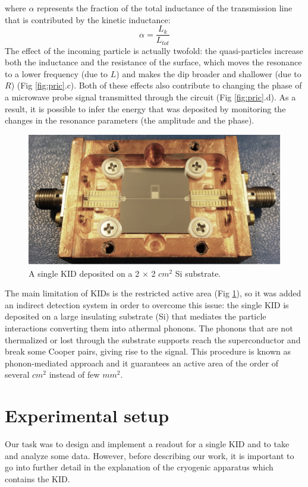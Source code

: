 \documentclass[12pt]{article}
\begin{document}
where $\alpha$ represents the fraction of the total inductance of the transmission line that is contributed by the kinetic inductance:
\begin{equation}
    \alpha = \frac{L_{k}}{L_{tot}}
\end{equation}
The effect of the incoming particle is actually twofold: the quasi-particles increase both the inductance and the resistance of the surface, which moves the resonance to a lower frequency (due to $L$) and makes the dip broader and shallower (due to $R$) (Fig \ref{fig:pric}.c). Both of these effects also contribute to changing the phase of a microwave probe signal transmitted through the circuit (Fig \ref{fig:pric}.d). As a result, it is possible to infer the energy that was deposited by monitoring the changes in the resonance parameters (the amplitude and the phase).\\
\begin{figure}[H] 
        \centering \includegraphics[width=0.9\columnwidth]{KID.png}
        \caption{
                \label{fig:KID} A single KID deposited on a 2 × 2 $cm^2$ Si substrate.
        }
\end{figure}

The main limitation of KIDs is the restricted active area (Fig \ref{fig:KID}), so it was added an indirect detection system in order to overcome this issue: the single KID is deposited on a large insulating substrate (Si) that mediates the particle interactions converting them into athermal phonons. The phonons that are not thermalized or lost through the substrate supports reach the superconductor and break some Cooper pairs, giving rise to the signal. This procedure is known as phonon-mediated approach and it guarantees an active area of the order of several $cm^2$ instead of few $mm^2$.
\section{Experimental setup}
Our task was to design and implement a readout for a single KID and to take and analyze some data.
However, before describing our work, it is important to go into further detail in the explanation of the cryogenic apparatus which contains the KID.
\end{document}
